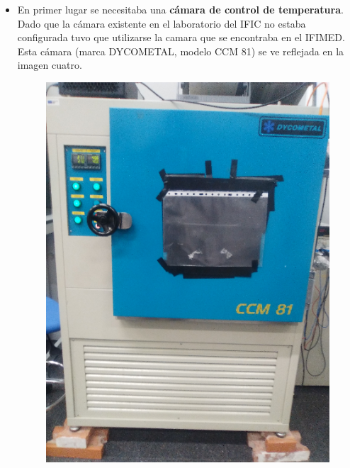 \documentclass[11pt, a4paper]{article}
\begin{document}
\begin{itemize}
\item {} En primer lugar se necesitaba una \textbf{cámara de control de temperatura}. 
\newline
Dado que la cámara existente en el laboratorio del IFIC no estaba configurada tuvo que utilizarse la camara que se encontraba en el IFIMED. Esta cámara (marca DYCOMETAL, modelo CCM 81) se ve reflejada en la imagen cuatro.

\begin{figure}[htb]
\centering
{
\includegraphics[scale=0.15]{SistemaTemperatura.png} 
}
{
}
\end{figure}
\end{itemize}
\end{document}
